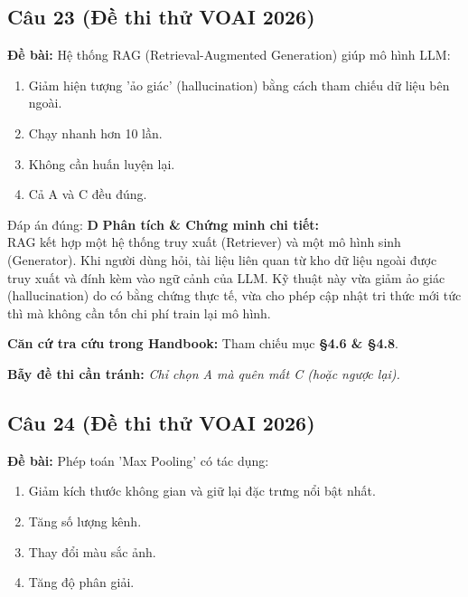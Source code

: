 \documentclass[10pt,a4paper]{article}
\begin{document}
\subsection*{Câu 23 (Đề thi thử VOAI 2026)}
\textbf{Đề bài:} Hệ thống RAG (Retrieval-Augmented Generation) giúp mô hình LLM:

\begin{enumerate}[label=\textbf{\Alph*.}]
    \item Giảm hiện tượng 'ảo giác' (hallucination) bằng cách tham chiếu dữ liệu bên ngoài.
    \item Chạy nhanh hơn 10 lần.
    \item Không cần huấn luyện lại.
    \item Cả A và C đều đúng.
\end{enumerate}

\begin{solbox}{Đáp án đúng: \textbf{D}}
\textbf{Phân tích \& Chứng minh chi tiết:} \\
RAG kết hợp một hệ thống truy xuất (Retriever) và một mô hình sinh (Generator). Khi người dùng hỏi, tài liệu liên quan từ kho dữ liệu ngoài được truy xuất và đính kèm vào ngữ cảnh của LLM. Kỹ thuật này vừa giảm ảo giác (hallucination) do có bằng chứng thực tế, vừa cho phép cập nhật tri thức mới tức thì mà không cần tốn chi phí train lại mô hình.

\vspace{0.4em}
\textbf{Căn cứ tra cứu trong Handbook:} Tham chiếu mục \textbf{§4.6 \& §4.8}.

\vspace{0.4em}
\textbf{Bẫy đề thi cần tránh:} \textit{Chỉ chọn A mà quên mất C (hoặc ngược lại).}
\end{solbox}
\vspace{0.5em}


\subsection*{Câu 24 (Đề thi thử VOAI 2026)}
\textbf{Đề bài:} Phép toán 'Max Pooling' có tác dụng:

\begin{enumerate}[label=\textbf{\Alph*.}]
    \item Giảm kích thước không gian và giữ lại đặc trưng nổi bật nhất.
    \item Tăng số lượng kênh.
    \item Thay đổi màu sắc ảnh.
    \item Tăng độ phân giải.
\end{enumerate}
\end{document}
